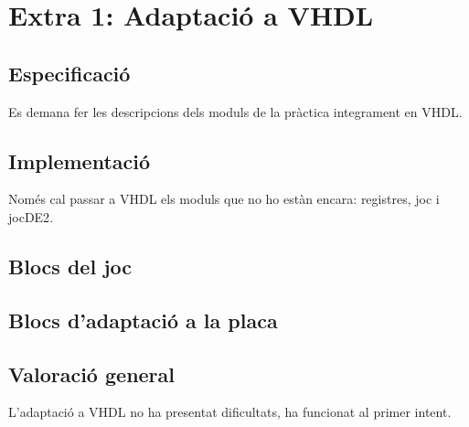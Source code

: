 \chapter{Extra 1: Adaptació a VHDL}

\section{Especificació}

Es demana fer les descripcions dels moduls de la pràctica integrament en VHDL.

\section{Implementació}

Només cal passar a VHDL els moduls que no ho estàn encara: \textsf{registres}, \textsf{joc} i \textsf{jocDE2}.

\section{Blocs del joc}

\section{Blocs d'adaptació a la placa}

\section{Valoració general}

L'adaptació a VHDL no ha presentat dificultats, ha funcionat al primer intent.
